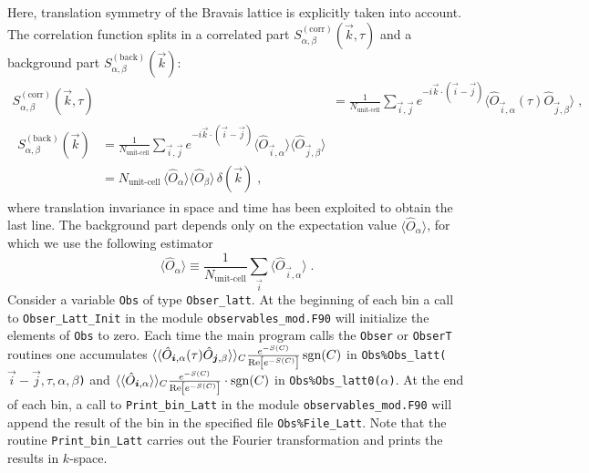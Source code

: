 %
Here,  translation symmetry of the Bravais lattice is explicitly taken into account. 
The correlation function splits in a correlated part $S_{\alpha,\beta}^{\mathrm{(corr)}}(\vec{k},\tau)$ and a background part $S_{\alpha,\beta}^{\mathrm{(back)}}(\vec{k})$:
\begin{align}
S_{\alpha,\beta}^{\mathrm{(corr)}}(\vec{k},\tau)
&=
\frac{1}{N_{\text{unit-cell}}} \sum_{\vec{i},\vec{j}}  e^{- i\vec{k} \cdot \left( \vec{i}-\vec{j}\right) }  \langle \hat{O}_{\vec{i},\alpha} (\tau) \hat{O}_{\vec{j},\beta} \rangle \label{eqn:s_corr} \;,\\
\begin{split}
S_{\alpha,\beta}^{\mathrm{(back)}}(\vec{k})
&=
\frac{1}{N_{\text{unit-cell}}} \sum_{\vec{i},\vec{j}}  e^{- i\vec{k} \cdot \left( \vec{i}-\vec{j}\right) }  \langle \hat{O}_{\vec{i},\alpha} \rangle \langle \hat{O}_{\vec{j},\beta} \rangle\\
&=
N_{\text{unit-cell}}\, \langle \hat{O}_{\alpha} \rangle \langle \hat{O}_{\beta} \rangle \, \delta(\vec{k}) \label{eqn:s_back}\;,
\end{split}
\end{align}
where translation invariance in space and time has been exploited to obtain the last line. 
The background part depends only on the expectation value $\langle \hat{O}_{\alpha} \rangle$, for which we use the following estimator 
\begin{equation}\label{eqn:o}
\langle \hat{O}_{\alpha} \rangle \equiv \frac{1}{N_{\text{unit-cell}}} \sum\limits_{\vec{i}} \langle \hat{O}_{\vec{i},\alpha} \rangle\;.
\end{equation}
Consider a variable  \texttt{Obs} of type  \texttt{Obser\_latt}. At the beginning of each bin a call to  \texttt{Obser\_Latt\_Init} in the module \texttt{observables\_mod.F90}  will  initialize  the elements of \texttt{Obs} to zero.    Each time the main program calls the   \texttt{Obser} or  \texttt{ObserT} routines one accumulates $ \langle \langle \hat{O}_{\boldsymbol{i},\alpha} (\tau) \hat{O}_{\boldsymbol{j},\beta} \rangle \rangle_{C} \allowbreak \frac{e^{-S(C)}} {\operatorname{Re} \left[e^{-S(C)} \right]}  \operatorname{sgn}(C) $    in  \texttt{Obs\%Obs\_latt($\vec{i}-\vec{j},\tau,\alpha,\beta$)}   
and $ \langle \langle \hat{O}_{\boldsymbol{i},\alpha} \rangle \rangle_{C} \frac{e^{-S(C)}} {\operatorname{Re} \left[e^{-S(C)} \right]}\cdot \allowbreak \operatorname{sgn}(C) $  in \texttt{Obs\%Obs\_latt0($\alpha$)}.   At the end of each bin, a call to \texttt{Print\_bin\_Latt} in the module  \texttt{observables\_mod.F90}   will append the result of the bin in the specified  file \texttt{Obs\%File\_Latt}.   Note that the routine  \texttt{Print\_bin\_Latt}  carries out the Fourier transformation and prints the results in $k$-space. 
